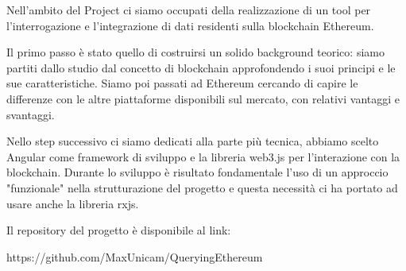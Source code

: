 \par \noindent
Nell'ambito del Project ci siamo occupati della realizzazione di un tool per l'interrogazione e l'integrazione di dati residenti sulla blockchain Ethereum.
\vspace{0.5cm}
\par \noindent
Il primo passo è stato quello di costruirsi un solido background teorico: siamo partiti dallo studio dal concetto di blockchain approfondendo i suoi principi e le sue caratteristiche. Siamo poi passati ad Ethereum cercando di capire le differenze con le altre piattaforme disponibili sul mercato, con relativi vantaggi e svantaggi.
\vspace{0.5cm}
\par \noindent
Nello step successivo ci siamo dedicati alla parte più tecnica, abbiamo scelto Angular come framework di sviluppo e la libreria web3.js per l'interazione con la blockchain. Durante lo sviluppo è risultato fondamentale l'uso di un approccio "funzionale" nella strutturazione del progetto e questa necessità ci ha portato ad usare anche la libreria rxjs.

\vspace{0.5cm}

\par \noindent
Il repository del progetto è disponibile al link:

https://github.com/MaxUnicam/QueryingEthereum
